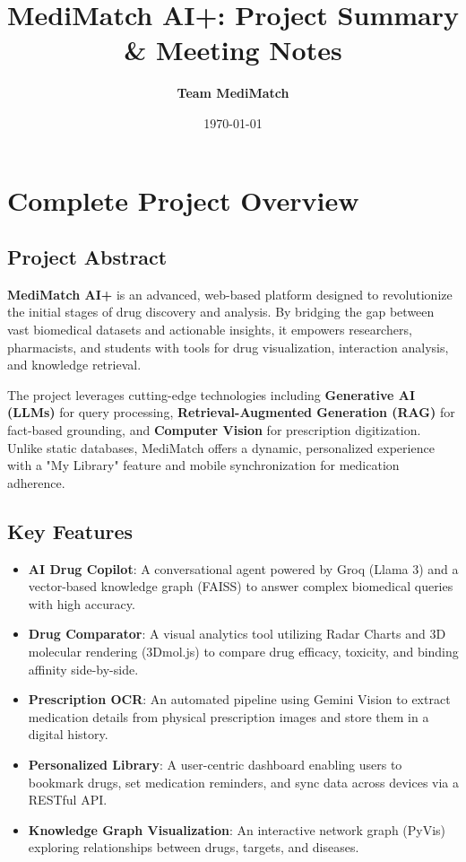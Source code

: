 \documentclass[a4paper,12pt]{article}
\title{\textbf{MediMatch AI+: Project Summary \& Meeting Notes}}
\author{\textbf{Team MediMatch}}
\date{\today}
\begin{document}
\maketitle

\tableofcontents
\newpage

\section{Complete Project Overview}

\subsection{Project Abstract}
\textbf{MediMatch AI+} is an advanced, web-based platform designed to revolutionize the initial stages of drug discovery and analysis. By bridging the gap between vast biomedical datasets and actionable insights, it empowers researchers, pharmacists, and students with tools for drug visualization, interaction analysis, and knowledge retrieval. 

The project leverages cutting-edge technologies including \textbf{Generative AI (LLMs)} for query processing, \textbf{Retrieval-Augmented Generation (RAG)} for fact-based grounding, and \textbf{Computer Vision} for prescription digitization. Unlike static databases, MediMatch offers a dynamic, personalized experience with a "My Library" feature and mobile synchronization for medication adherence.

\subsection{Key Features}
\begin{itemize}
    \item \textbf{AI Drug Copilot}: A conversational agent powered by Groq (Llama 3) and a vector-based knowledge graph (FAISS) to answer complex biomedical queries with high accuracy.
    \item \textbf{Drug Comparator}: A visual analytics tool utilizing Radar Charts and 3D molecular rendering (3Dmol.js) to compare drug efficacy, toxicity, and binding affinity side-by-side.
    \item \textbf{Prescription OCR}: An automated pipeline using Gemini Vision to extract medication details from physical prescription images and store them in a digital history.
    \item \textbf{Personalized Library}: A user-centric dashboard enabling users to bookmark drugs, set medication reminders, and sync data across devices via a RESTful API.
    \item \textbf{Knowledge Graph Visualization}: An interactive network graph (PyVis) exploring relationships between drugs, targets, and diseases.
\end{itemize}
\end{document}
